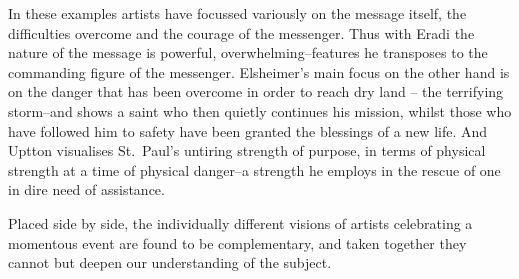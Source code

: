 \documentclass[a4paper,12pt]{article}
\begin{document}
In these examples artists have focussed variously on the message
itself, the difficulties overcome and the courage of the messenger.
Thus with Eradi the nature of the message is powerful,
overwhelming--features he transposes to the commanding figure of the
messenger.  Elsheimer's main focus on the other hand is on the danger
that has been overcome in order to reach dry land – the terrifying
storm--and shows a saint who then quietly continues his mission,
whilst those who have followed him to safety have been granted the
blessings of a new life.  And Uptton visualises St.~Paul's untiring
strength of purpose, in terms of physical strength at a time of
physical danger--a strength he employs in the rescue of one in dire
need of assistance.


Placed side by side, the individually different visions of
artists celebrating a momentous event are found to be complementary,
and taken together they cannot but deepen our understanding of the
subject.
\end{document}
